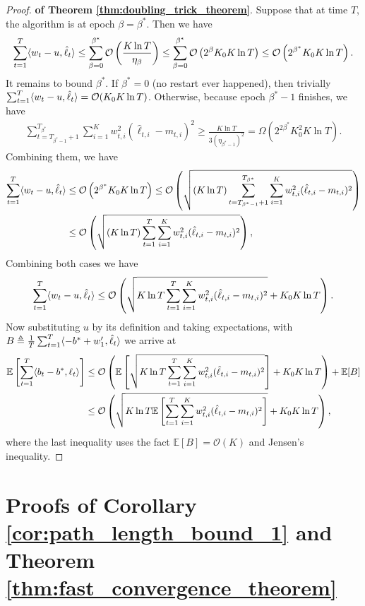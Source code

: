 \begin{proof}{\textbf{of Theorem \ref{thm:doubling_trick_theorem}}.}
Suppose that at time $T$, the algorithm is at epoch $\beta=\beta^*$. Then we have
\[
\sum_{t=1}^T\langle {w_t-u, \hat{\ell}_t} \rangle\leq\sum_{\beta=0}^{\beta^*}\mathcal{O}\left( \frac{K\ln T}{\eta_\beta} \right)\leq \sum_{\beta=0}^{\beta^*}\mathcal{O}\left( 2^\beta K_0 K\ln T \right)\leq\mathcal{O}\left(2^{\beta^*}K_0 K\ln T\right).
\]
It remains to bound $\beta^*$.
If $\beta^*=0$ (no restart ever happened), then trivially $\sum_{t= 1}^{T}\langle {w_t-u, \hat{\ell}_t} \rangle=\mathcal{O}(K_0 K\ln T)$. 
Otherwise, because epoch $\beta^*-1$ finishes, we have 
\begin{align*}
\sum_{t= T_{\beta^*-1}+1}^{T_{\beta^*}}\sum_{i=1}^K w_{t,i}^2(\hat{\ell}_{t,i}-m_{t,i})^2 \geq \frac{K\ln T}{3(\eta_{\beta^*-1})^2} = \Omega(2^{2\beta^*}K_0^2K\ln T).  
\end{align*}
Combining them, we have 
\begin{align}
\sum_{t=1}^T\langle {w_t-u, \hat{\ell}_t} \rangle &\leq \mathcal{O}\left(2^{\beta^*}K_0K\ln T\right)
\leq \mathcal{O}\left( \sqrt{(K\ln T)\sum_{t= T_{\beta^*-1}+1}^{T_{\beta^*}}\sum_{i=1}^K w_{t,i}^2(\hat{\ell}_{t,i}-m_{t,i})^2} \right) \nonumber \\
&\leq \mathcal{O}\left( \sqrt{(K\ln T)\sum_{t= 1}^{T}\sum_{i=1}^K w_{t,i}^2(\hat{\ell}_{t,i}-m_{t,i})^2} \right), \label{eqn:doubling_bound_1}
\end{align}
Combining both cases we have 
\begin{align}
\sum_{t=1}^T\langle {w_t-u, \hat{\ell}_t} \rangle \leq \mathcal{O}\left( \sqrt{K\ln T\sum_{t= 1}^{T}\sum_{i=1}^K w_{t,i}^2(\hat{\ell}_{t,i}-m_{t,i})^2} + K_0K\ln T\right).
\end{align}
Now substituting $u$ by its definition and taking expectations, with $B\triangleq \frac{1}{T} \sum_{t=1}^T \langle {-b^*+w_1^\prime, \hat{\ell}_{t}} \rangle$ we arrive at 
\begin{align*}
\mathbb{E}\left[ \sum_{t=1}^T \langle {b_t-b^*, \ell_t} \rangle \right]
&\leq \mathcal{O}\left(\mathbb{E}\left[\sqrt{K\ln T\sum_{t= 1}^{T}\sum_{i=1}^K w_{t,i}^2(\hat{\ell}_{t,i}-m_{t,i})^2}\right]+K_0K\ln T \right)+\mathbb{E}[B] \\
&\leq \mathcal{O}\left(  \sqrt{K\ln T\mathbb{E}\left[\sum_{t= 1}^{T}\sum_{i=1}^K w_{t,i}^2(\hat{\ell}_{t,i}-m_{t,i})^2\right]}+K_0K\ln T \right), 
\end{align*}
where the last inequality uses the fact $\mathbb{E}[B]=\mathcal{O}(K)$ and Jensen's inequality.
\end{proof}


\section{Proofs of Corollary \ref{cor:path_length_bound_1} and Theorem \ref{thm:fast_convergence_theorem}}

